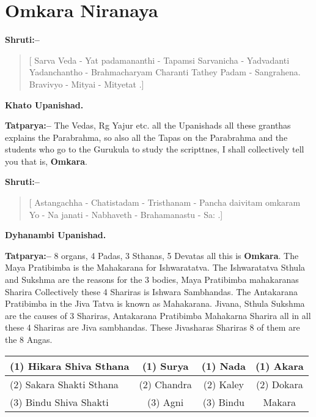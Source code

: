\chapter{Omkara Niranaya}

\textbf{Shruti:–}

\begin{verse}
[ Sarva Veda - Yat padamananthi  - Tapamsi Sarvanicha - Yadvadanti  Yadanchantho - Brahmacharyam Charanti  Tathey Padam - Sangrahena. Bravivyo - Mityai - Mityetat .]
\end{verse}

\begin{flushright}
\textbf{Khato Upanishad.}
\end{flushright}

\textbf{Tatparya:–} The Vedas, Rg Yajur etc. all the Upanishads all these granthas explains the Parabrahma, so also all the Tapas on the Parabrahma and the students who go to the Gurukula to study the scripttnes, I shall collectively tell you that is, \textbf{Omkara}.

\textbf{Shruti:–}

\begin{verse}
[ Astangachha - Chatistadam - Tristhanam - Pancha daivitam  omkaram Yo - Na janati - Nabhaveth - Brahamanastu - Sa: .]
\end{verse}

\begin{flushright}
\textbf{Dyhanambi Upanishad.}
\end{flushright}

\textbf{Tatparya:–} 8 organs, 4 Padas, 3 Sthanas, 5 Devatas all this is \textbf{Omkara}. The Maya Pratibimba is the Mahakarana for Ishwaratatva. The Ishwaratatva Sthula and Sukshma are the reasons for the 3 bodies, Maya Pratibimba mahakaranas Sharira Collectively these 4 Shariras is Ishwara Sambhandas. The Antakarana Pratibimba in the Jiva Tatva is known as Mahakarana. Jivana, Sthula Sukshma are the causes of 3 Shariras, Antakarana Pratibimba Mahakarna Sharira all in all these 4 Shariras are Jiva sambhandas. These Jivasharas Shariras 8 of them are the 8 Angas.

\begin{table}[H]
\caption{\textbf{Tristhana Vivara}}
\begin{longtable}{@{}|l|c|c|c|@{}}
\hline
(1) Hikara Shiva Sthana & (1) Surya & (1) Nada & (1) Akara \\
\hline
(2) Sakara Shakti Sthana & (2) Chandra & (2) Kaley & (2) Dokara \\
\hline
(3) Bindu Shiva Shakti & (3) Agni & (3) Bindu & Makara \\
\hline
\end{longtable}
\end{table}

